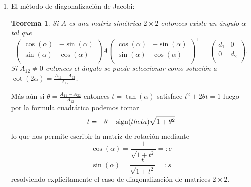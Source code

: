 \documentclass[12pt]{amsart}
\newtheorem{theorem}[lemma]{Teorema}
\theoremstyle{definition}
\newtheorem{examplex}[lemma]{Example}
\begin{document}
\begin{enumerate}
\begin{examplex} Supongamos que $A$ tiene un valor propio simple $\lambda_j$ y que tenemos una aproximaci\'on $\mu$ de este valor propio que está m\'as cerca de $\lambda_j$ que de ningún otro, es decir
\[|\lambda_j-\mu|<\min_{k\neq j} |\lambda_k-\mu|.\]
Entonces la matriz $(A-\mu I)^{-1}$ tiene valores propios $\frac{1}{\lambda_t-\mu}$ para $t=1,\dots, n$ y en particular tiene un valor propio dominante $1/(\mu-\lambda_j)$ de donde podemos calcular $\lambda_j$ aplicando el método de la potencia a la matriz $B=(A-\mu I)^{-1}$. Explícitamente, empezamos de $y_0\neq 0$ y definimos
\[y_m = (A-\mu I)^{-1}x_{m-1}\]
\[x_m = y_m/\|y_m\|.\]
Notar que $y_m$ se obtiene resolviendo el sistema de ecuaciones muchas veces
\[(A-\mu I)y_m =x_{m-1}\]
Esto puede hacerse eficientemente mediante una factorización ($LU$ ó $QR$) de $A-\mu I$ {\bf una vez} y re-utilizándola en todas las iteraciones.
\end{examplex}

\item El método de diagonalización de Jacobi:

\begin{theorem} Si $A$ es una matriz simétrica $2\times 2$ entonces existe un \'angulo $\alpha$ tal que
\[
\left(
\begin{array}{cc}
\cos(\alpha) & -\sin(\alpha)\\
\sin(\alpha) & \cos(\alpha)\\ 
\end{array}
\right) A
\left(
\begin{array}{cc}
\cos(\alpha) & -\sin(\alpha)\\
\sin(\alpha) & \cos(\alpha)\\ 
\end{array}
\right)^{\top} = \left(\begin{array}{cc}
d_1 & 0 \\
0 & d_2 \\
\end{array}
\right).
\]
Si $A_{12}\neq 0$ entonces el ángulo se puede seleccionar como solución a $\cot(2\alpha)= \frac{A_{11}-A_{22}}{A_{12}}$.
\end{theorem}

Más aún si $\theta = \frac{A_{11}-A_{22}}{A_{12}}$ entonces $t=\tan(\alpha)$ satisface $t^2+2\theta t=1$  luego por la formula cuadrática podemos tomar 
\[t=-\theta +{\rm sign}(theta)\sqrt{1+\theta^2}\] lo que nos permite escribir la matriz de rotación mediante
\[\cos(\alpha)=\frac{1}{\sqrt{1+t^2}}=:c\]
\[\sin(\alpha)=\frac{t}{\sqrt{1+t^2}}=:s\]
resolviendo explícitamente el caso de diagonalización de matrices $2\times 2$.
\end{enumerate}
\end{document}
